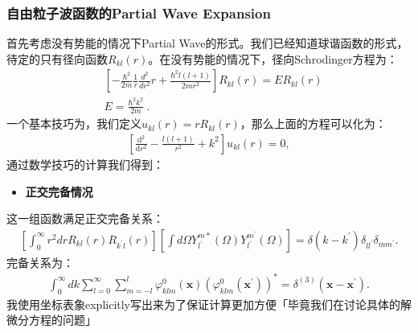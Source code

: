 \subsubsection{自由粒子波函数的Partial Wave Expansion}


首先考虑没有势能的情况下Partial Wave的形式。我们已经知道球谐函数的形式，待定的只有径向函数$ R_{kl}(r)
$。在没有势能的情况下，径向Schrodinger方程为：
\begin{align}
  &\left[-\frac{\hbar^2}{2m}\frac{1}{r}\frac{d^2}{dr^2}r+\frac{\hbar^2
  l(l+1)}{2mr^2}\right]R_{kl}(r)=E R_{kl}(r)\\
  &E=\frac{\hbar^2 k^2}{2m}\mathrm{~.}
\end{align}
一个基本技巧为，我们定义$ u_{kl}(r)=rR_{kl}(r) $，那么上面的方程可以化为：
\begin{align}
  \left[\frac{\mathrm{d}^2}{\mathrm{d}r^2}-\frac{l(l+1)}{r^2}+k^2
  \right]u_{kl}(r)=0,
\end{align}
通过数学技巧的计算我们得到：

\bigskip
{}
\begin{itemize}
  \item \textbf{正交完备情况}
\end{itemize}
这一组函数满足正交完备关系：
\begin{align}
  \left[\int_0^\infty
  r^2drR_{kl}(r)R_{k^{\prime}l}(r)\right]\left[\int d\Omega
  Y_{l^{\prime}}^{m*}(\Omega)Y_{l^{\prime}}^{m^{\prime}}(\Omega)\right]=\delta(k-k^{\prime})\delta_{ll^{\prime}}\delta_{mm^{\prime}}.
\end{align}
完备关系为：
\begin{align}
  \int_0^\infty
  dk\sum_{l=0}^\infty\sum_{m=-l}^l\varphi_{klm}^0(\mathbf{x})\left(\varphi_{klm}^0(\mathbf{x}^{\prime})\right)^*=\delta^{(3)}(\mathbf{x}-\mathbf{x}^{\prime}).
\end{align}
我使用坐标表象explicitly写出来为了保证计算更加方便「毕竟我们在讨论具体的解微分方程的问题」

